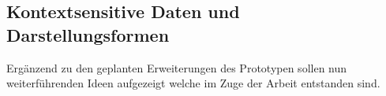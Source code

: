 \documentclass[Bachelorarbeit.tex]{subfiles}
\begin{document}
\subsection{Kontextsensitive Daten und Darstellungsformen}
Ergänzend zu den geplanten Erweiterungen des Prototypen sollen nun weiterführenden Ideen aufgezeigt welche im Zuge der Arbeit entstanden sind.

\begin{comment}
\subsection*{Motivation und erste Überlegungen}
Die Motivation dieser Arbeit besteht darin die Planung bei der Ressourceneinteilung zu optimieren, konkret an dem Beispiel der Außendienstplanung. 
Auf Grund von Gesprächen erfuhr ich wie Umständlich die Planung von Außendiensttätigkeiten, mit den zur Verfügung stehenden Mitteln ist und setzte mir das Ziel zu untersuchen wie diese Arbeit erleichtert und optimiert werden kann.\\
\\
Anhand erster Überlegungen wurde eine Problemstellung aufgesetzt welche für den weiteren Vorgang der Arbeit als Grundlage dienen soll. 
Dabei muss beachtet werden das es sich bei der Problemstellung (siehe Gleichnamigen Abschnitt im Kapitel Einführung) um reine Annahmen handelt, da der Autor keine eigene Erfahrungen auf dem Gebiet der Außendienstplanung besitzt.
Im speziellen wurden dabei die Themen verteilte Informationen, Komplexität und Wissensmanagement identifiziert (siehe Abschnitt \nameref{chap:einfuehrung:sec:problemstellung})
Mittels der Annahmen aus der Problemstellung wurden erste Lösungsansätze entwickelt um zu erfahren ob und wie diese hypothetischen Problem lösbar sind.
Dafür wurde unter anderem überlegt der Komplexität mit Hilfe von verschiedenen Visualisierungsformen (Karten- und Listenansicht) entgegenzutreten.
Auf Basis dieser Erkenntnisse wurde ein mögliches Anwendungsszenario entworfen wie ein fiktiver Prototyp verwendet werden könnte.

\subsection*{Überblick der bestehenden Konzepte}
Darauf hin wurde untersucht wie etablierte Webseiten, mit einem ähnlichen Aufgabengebiet, ihre Informationen visualisieren und was sie den Nutzer\_innen für Möglichkeiten bieten (siehe Kapitel \nameref{chap:analyse}). 
Zusätzlich zu den bestehenden Lösungen wurden technischen Möglichkeiten betrachtet mit dessen Hilfe sich ein Prototyp realisieren lässt.
Anhand der Bedarfsanforderung (siehe gleichnamigen Abschnitt) wurde für diesen Zweck Leaflet.js, aufgrund der Abdeckung der Anforderung sowie seiner einfachen Verwendungsweise und, ausgewählt (siehe Abschnitt \nameref{AuswahlDerTechnologie}).


\end{comment}
\end{document}
